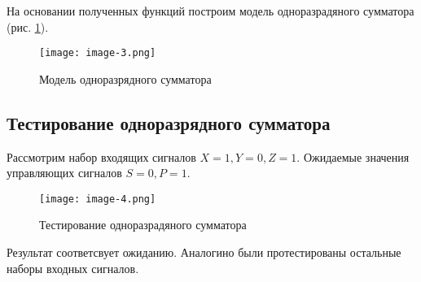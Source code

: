 На основании полученных функций построим модель одноразрадяного сумматора (рис. \ref{image:3}).

\begin{figure}[h]
    \centering
    \texttt{[image: image-3.png]}
    \caption{Модель одноразрядного сумматора}
    \label{image:3}
\end{figure}

\newpage
\subsection*{Тестирование одноразрядного сумматора}

Рассмотрим набор входящих сигналов $X=1,Y=0,Z=1$. Ожидаемые значения управляющих сигналов $S=0,P=1$.\par

\begin{figure}[h]
    \centering
    \texttt{[image: image-4.png]}
    \caption{Тестирование одноразрадяного сумматора}
    \label{image:4}
\end{figure}

Результат соответсвует ожиданию. Аналогино были протестированы остальные наборы входных сигналов.